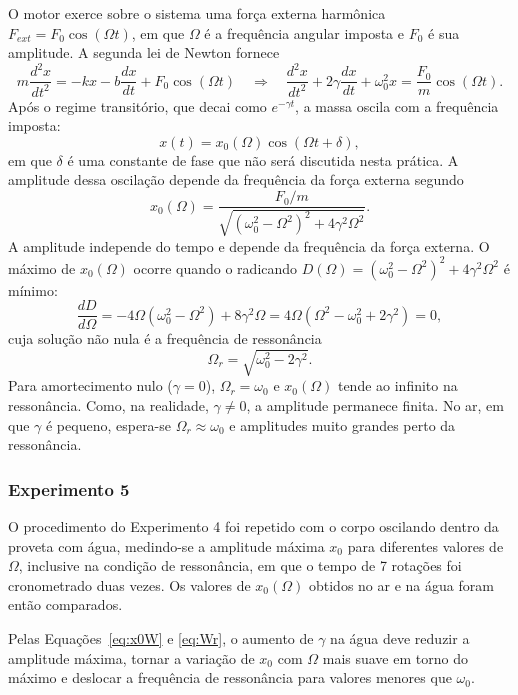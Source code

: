 O motor exerce sobre o sistema uma força externa harmônica $F_{ext}=F_0\cos(\Omega t)$, em que $\Omega$ é a frequência angular imposta e $F_0$ é sua amplitude. A segunda lei de Newton fornece
\[
m\frac{d^2x}{dt^2}=-kx-b\frac{dx}{dt}+F_0\cos(\Omega t)
\quad\Longrightarrow\quad
\frac{d^2x}{dt^2}+2\gamma\frac{dx}{dt}+\omega_0^2x=\frac{F_0}{m}\cos(\Omega t).
\]
Após o regime transitório, que decai como $e^{-\gamma t}$, a massa oscila com a frequência imposta:
\[
x(t)=x_0(\Omega)\cos(\Omega t+\delta),
\]
em que $\delta$ é uma constante de fase que não será discutida nesta prática. A amplitude dessa oscilação depende da frequência da força externa segundo
\begin{equation}
x_0(\Omega)=\frac{F_0/m}{\sqrt{\left(\omega_0^2-\Omega^2\right)^2+4\gamma^2\Omega^2}}.
\label{eq:x0W}
\end{equation}
A amplitude independe do tempo e depende da frequência da força externa. O máximo de $x_0(\Omega)$ ocorre quando o radicando $D(\Omega)=\left(\omega_0^2-\Omega^2\right)^2+4\gamma^2\Omega^2$ é mínimo:
\[
\frac{dD}{d\Omega}=-4\Omega\left(\omega_0^2-\Omega^2\right)+8\gamma^2\Omega
=4\Omega\left(\Omega^2-\omega_0^2+2\gamma^2\right)=0,
\]
cuja solução não nula é a frequência de ressonância
\begin{equation}
\Omega_r=\sqrt{\omega_0^2-2\gamma^2}.
\label{eq:Wr}
\end{equation}
Para amortecimento nulo ($\gamma=0$), $\Omega_r=\omega_0$ e $x_0(\Omega)$ tende ao infinito na ressonância. Como, na realidade, $\gamma\neq0$, a amplitude permanece finita. No ar, em que $\gamma$ é pequeno, espera-se $\Omega_r\approx\omega_0$ e amplitudes muito grandes perto da ressonância.

\subsubsection{Experimento 5}

O procedimento do Experimento 4 foi repetido com o corpo oscilando dentro da proveta com água, medindo-se a amplitude máxima $x_0$ para diferentes valores de $\Omega$, inclusive na condição de ressonância, em que o tempo de 7 rotações foi cronometrado duas vezes. Os valores de $x_0(\Omega)$ obtidos no ar e na água foram então comparados.

Pelas Equações~\eqref{eq:x0W} e \eqref{eq:Wr}, o aumento de $\gamma$ na água deve reduzir a amplitude máxima, tornar a variação de $x_0$ com $\Omega$ mais suave em torno do máximo e deslocar a frequência de ressonância para valores menores que $\omega_0$.
